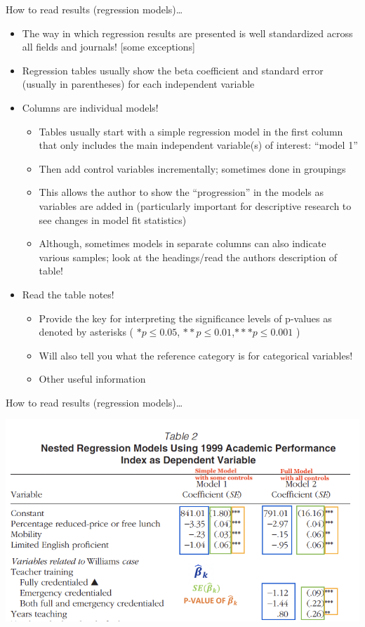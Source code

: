 \documentclass[
  8pt,
  ignorenonframetext,
  dvipsnames]{beamer}
\providecommand{\tightlist}{%
  \setlength{\itemsep}{0pt}\setlength{\parskip}{0pt}}
\let\olditem\item
\renewcommand{\item}{%
  \olditem\vspace{4pt}
}
\begin{document}
\begin{frame}{How to read results (regression models)\ldots{}}
\protect\hypertarget{how-to-read-results-regression-models}{}

\begin{itemize}
\tightlist
\item
  The way in which regression results are presented is well standardized
  across all fields and journals! {[}some exceptions{]}
\item
  Regression tables usually show the beta coefficient and standard error
  (usually in parentheses) for each independent variable
\item
  Columns are individual models!

  \begin{itemize}
  \tightlist
  \item
    Tables usually start with a simple regression model in the first
    column that only includes the main independent variable(s) of
    interest: ``model 1''
  \item
    Then add control variables incrementally; sometimes done in
    groupings
  \item
    This allows the author to show the ``progression'' in the models as
    variables are added in (particularly important for descriptive
    research to see changes in model fit statistics)
  \item
    Although, sometimes models in separate columns can also indicate
    various samples; look at the headings/read the authors description
    of table!
  \end{itemize}
\item
  Read the table notes!

  \begin{itemize}
  \tightlist
  \item
    Provide the key for interpreting the significance levels of p-values
    as denoted by asterisks ( \(*p\le 0.05\),
    \(**p\le 0.01\),\(***p\le 0.001\) )
  \item
    Will also tell you what the reference category is for categorical
    variables!
  \item
    Other useful information
  \end{itemize}
\end{itemize}

\end{frame}

\begin{frame}{How to read results (regression models)\ldots{}}
\protect\hypertarget{how-to-read-results-regression-models-1}{}

\includegraphics{POWERS_REGTABLE.png}

\end{frame}
\end{document}
